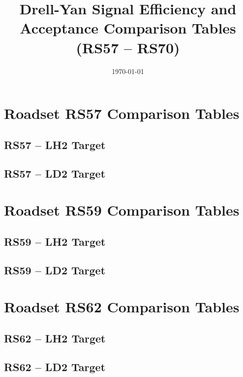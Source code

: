\documentclass[11pt, letterpaper]{article}
\title{\textbf{Drell-Yan Signal Efficiency and Acceptance Comparison Tables \\ (RS57 -- RS70)}}
\date{\today}
\begin{document}
\maketitle
\tableofcontents
\clearpage

\section{Roadset RS57 Comparison Tables}
\subsection{RS57 -- LH2 Target}


\subsection{RS57 -- LD2 Target}


\clearpage

\section{Roadset RS59 Comparison Tables}
\subsection{RS59 -- LH2 Target}


\subsection{RS59 -- LD2 Target}


\clearpage

\section{Roadset RS62 Comparison Tables}
\subsection{RS62 -- LH2 Target}


\subsection{RS62 -- LD2 Target}


\clearpage
\end{document}
